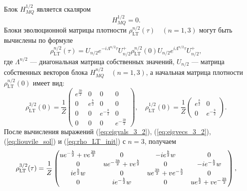 %
Блок $H^{1/2}_{MQ}$ является скаляром
%
\begin{equation}\label{eq:ham_1_2}
  H^{1/2}_{MQ} = 0.
\end{equation}
%
Блоки эволюционной матрицы плотности $\rho_\mathrm{LT}^{n/2}(\tau) \quad (n = 1, 3)$
могут быть вычислены по формуле
%
\begin{equation}\label{eq:liouvile_sol}
  \rho_\mathrm{LT}^{n/2}(\tau) =
  U_{n/2} e^{-i\Lambda^{n/2}\tau} U^{+}_{n/2}
  \rho^{n/2}_\mathrm{LT}(0)
  U_{n/2} e^{i\Lambda^{n/2}\tau} U^{+}_{n/2},
\end{equation}
%
где $\Lambda^{n/2}$ --- диагональная матрица собственных значений,
$U_{n/2}$ --- матрица собственных векторов блока $H_{MQ}^{n/2} \quad (n=1, 3)$,
а начальная матрица плотности $\rho_\mathrm{LT}^{n/2}(0)$ имеет вид:
%
\begin{equation}\label{eq:rho_LT_init}
  \rho_\mathrm{LT}^{3/2}(0) = \dfrac 1 Z
  \begin{pmatrix}
      e^{\frac{3b}{2}} & 0 & 0 & 0
      \\
      0 & e^{\frac{b}{2}} & 0 & 0
      \\
      0 & 0 & e^{-\frac{b}{2}} & 0
      \\
      0 & 0 & 0 & e^{-\frac{3b}{2}}
  \end{pmatrix},
  \quad
  \rho_\mathrm{LT}^{1/2}(0) = \dfrac 1 Z
  \begin{pmatrix}
      e^{\frac{b}{2}} & 0
      \\
      0 & e^{-\frac{b}{2}}
  \end{pmatrix}.
\end{equation}
После вычисления выражений
(\ref{eq:eigvals_3_2}),
(\ref{eq:eigvecs_3_2}),
(\ref{eq:liouvile_sol})
и (\ref{eq:rho_LT_init}) с $n = 3$,
получаем
%
\begin{equation}\label{eq:rho_LT_eval_3_2}
  \rho_\mathrm{LT}^{3/2}(\tau) = \frac{1}{Z} \\
  \begin{pmatrix}
      ue^{-\frac{b}{2}} + ve^{\frac{3b}{2}}
    &
      0
    &
      -ie^{\frac{b}{2}}w
    &
      0
    \\
      0
    &
      ue^{-\frac{3b}{2}} + ve^{\frac{b}{2}}
    &
      0
    &
      -ie^{-\frac{b}{2}}w
    \\
      ie^{\frac{b}{2}}w
    &
      0
    &
      ue^{\frac{3b}{2}} + ve^{-\frac{b}{2}}
    &
      0
    \\
      0
    &
      ie^{-\frac{b}{2}}w
    &
      0
    &
      ue^{\frac{b}{2}} + ve^{-\frac{3b}{2}}
  \end{pmatrix},
\end{equation}
